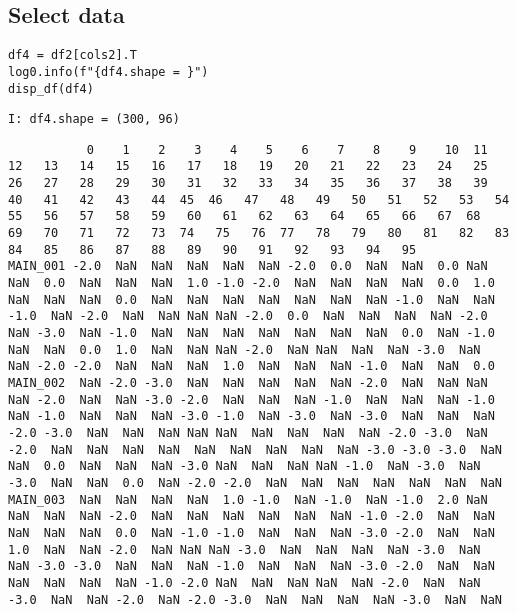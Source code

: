\documentclass[a4paper,10pt,onecolumn,oneside,openright]{article}
\begin{document}
\subsection{Select data}
\label{sec:org18c7874}
\begin{verbatim}
df4 = df2[cols2].T
log0.info(f"{df4.shape = }")
disp_df(df4)
\end{verbatim}

\begin{verbatim}
I: df4.shape = (300, 96)
\end{verbatim}

\begin{verbatim}
           0    1    2    3    4    5    6    7    8    9    10  11   12   13   14   15   16   17   18   19   20   21   22   23   24   25   26   27   28   29   30   31   32   33   34   35   36   37   38   39   40   41   42   43   44  45  46   47   48   49   50   51   52   53   54   55   56   57   58   59   60   61   62   63   64   65   66   67  68   69   70   71   72   73  74   75   76  77   78   79   80   81   82   83   84   85   86   87   88   89   90   91   92   93   94   95
MAIN_001 -2.0  NaN  NaN  NaN  NaN  NaN -2.0  0.0  NaN  NaN  0.0 NaN  NaN  0.0  NaN  NaN  NaN  1.0 -1.0 -2.0  NaN  NaN  NaN  NaN  0.0  1.0  NaN  NaN  NaN  0.0  NaN  NaN  NaN  NaN  NaN  NaN  NaN -1.0  NaN  NaN -1.0  NaN -2.0  NaN  NaN NaN NaN -2.0  0.0  NaN  NaN  NaN  NaN -2.0  NaN -3.0  NaN -1.0  NaN  NaN  NaN  NaN  NaN  NaN  NaN  0.0  NaN -1.0 NaN  NaN  0.0  1.0  NaN  NaN NaN -2.0  NaN NaN  NaN  NaN -3.0  NaN  NaN -2.0 -2.0  NaN  NaN  NaN  1.0  NaN  NaN  NaN -1.0  NaN  NaN  0.0
MAIN_002  NaN -2.0 -3.0  NaN  NaN  NaN  NaN  NaN -2.0  NaN  NaN NaN  NaN -2.0  NaN  NaN -3.0 -2.0  NaN  NaN  NaN -1.0  NaN  NaN  NaN -1.0  NaN -1.0  NaN  NaN  NaN -3.0 -1.0  NaN -3.0  NaN -3.0  NaN  NaN  NaN -2.0 -3.0  NaN  NaN  NaN NaN NaN  NaN  NaN  NaN  NaN -2.0 -3.0  NaN -2.0  NaN  NaN  NaN  NaN  NaN  NaN  NaN  NaN  NaN -3.0 -3.0 -3.0  NaN NaN  0.0  NaN  NaN  NaN -3.0 NaN  NaN  NaN NaN -1.0  NaN -3.0  NaN -3.0  NaN  NaN  0.0  NaN -2.0 -2.0  NaN  NaN  NaN  NaN  NaN  NaN  NaN
MAIN_003  NaN  NaN  NaN  NaN  1.0 -1.0  NaN -1.0  NaN -1.0  2.0 NaN  NaN  NaN  NaN -2.0  NaN  NaN  NaN  NaN  NaN  NaN -1.0 -2.0  NaN  NaN  NaN  NaN  NaN  0.0  NaN -1.0 -1.0  NaN  NaN  NaN -3.0 -2.0  NaN  NaN  1.0  NaN  NaN -2.0  NaN NaN NaN -3.0  NaN  NaN  NaN  NaN -3.0  NaN  NaN -3.0 -3.0  NaN  NaN  NaN -1.0  NaN  NaN  NaN -3.0 -2.0  NaN  NaN NaN  NaN  NaN  NaN -1.0 -2.0 NaN  NaN  NaN NaN  NaN -2.0  NaN  NaN -3.0  NaN  NaN -2.0  NaN -2.0 -3.0  NaN  NaN  NaN  NaN -3.0  NaN  NaN

\end{verbatim}
\end{document}
